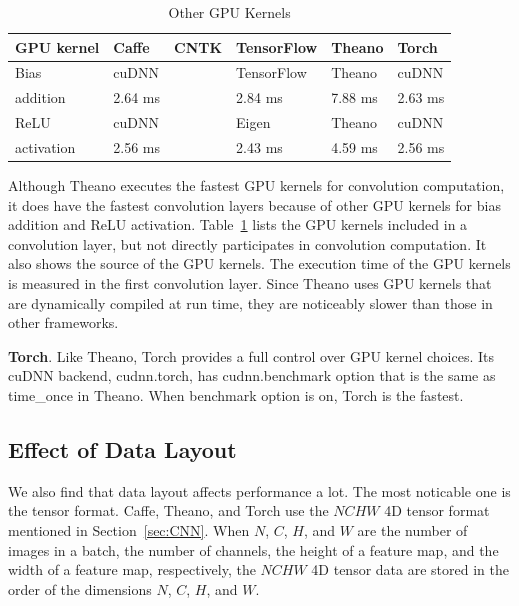 \begin{table}[htbp]
\centering
\caption{Other GPU Kernels}
\label{table_misc_kernel}
\begin{scriptsize}
\begin{tabular}{|l|l|l|l|l|l|}
\hline\hline
GPU kernel & Caffe    & CNTK & TensorFlow & Theano  & Torch \\ \hline\hline
Bias       & cuDNN    &      & TensorFlow & Theano  & cuDNN \\ \cline{2-6} 
addition   & 2.64 ms  &      & 2.84 ms    & 7.88 ms & 2.63 ms  \\ \hline\hline
ReLU       & cuDNN    &      & Eigen      & Theano  & cuDNN \\ \cline{2-6}
activation & 2.56 ms  &      & 2.43 ms    & 4.59 ms & 2.56 ms  \\ \hline
\end{tabular}
\end{scriptsize}
\end{table}

Although Theano executes the fastest GPU kernels for convolution computation, it does have the fastest convolution layers because of other GPU kernels for bias addition and ReLU activation. Table~\ref{table_misc_kernel} lists the GPU kernels included in a convolution layer, but not directly participates in convolution computation. It also shows the source of the GPU kernels. The execution time of the GPU kernels is measured in the first convolution layer. Since Theano uses GPU kernels that are dynamically compiled at run time, they are noticeably slower than those in other frameworks.

{\bf Torch}. Like Theano, Torch provides a full control over GPU kernel choices. Its cuDNN backend, cudnn.torch, has \textsf{cudnn.benchmark} option that is the same as \textsf{time\_once} in Theano. When \textsf{benchmark} option is on, Torch is the fastest. 

\subsection{Effect of Data Layout}
We also find that data layout affects performance a lot. The most noticable one is the tensor format.
Caffe, Theano, and Torch use the $NCHW$ 4D tensor format mentioned in Section~\ref{sec:CNN}. When $N$, $C$, $H$, and $W$ are the number of images in a batch, the number of channels, the height of a feature map, and the width of a feature map, respectively, the $NCHW$ 4D tensor data are stored in the order of the dimensions $N$, $C$, $H$, and $W$. 

